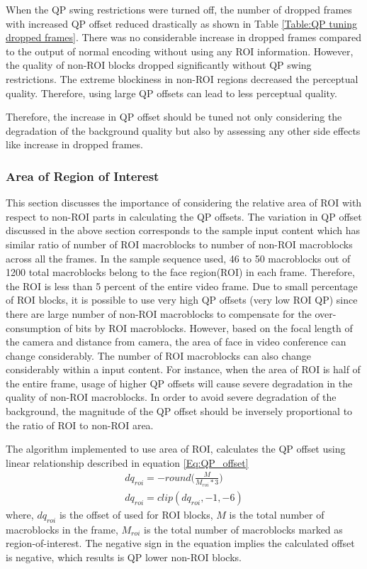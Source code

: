 \documentclass[11pt]{article} %
\begin{document}
When the QP swing restrictions were turned off, the number of dropped frames with increased QP offset reduced drastically as shown in Table \ref{Table:QP tuning dropped frames}. There was no considerable increase in dropped frames compared to the output of normal encoding without using any ROI information. However, the quality of non-ROI blocks dropped significantly without QP swing restrictions. The extreme blockiness in non-ROI regions decreased the perceptual quality. Therefore, using large QP offsets can lead to less perceptual quality. 

Therefore, the increase in QP offset should be tuned not only considering the degradation of the background quality but also by assessing any other side effects like increase in dropped frames.
%
\subsubsection{Area of Region of Interest}
This section discusses the importance of considering the relative area of ROI with respect to non-ROI parts in calculating the QP offsets. The variation in QP offset discussed in the above section corresponds to the sample input content which has similar ratio of number of ROI macroblocks to number of non-ROI macroblocks across all the frames. In the sample sequence used, 46 to 50 macroblocks out of 1200 total macroblocks belong to the face region(ROI) in each frame. Therefore, the ROI is less than 5 percent of the entire video frame. Due to small percentage of ROI blocks, it is possible to use very high QP offsets (very low ROI QP) since there are large number of non-ROI macroblocks to compensate for the over-consumption of bits by ROI macroblocks. However, based on the focal length of the camera and distance from camera, the area of face in video conference can change considerably. The number of ROI macroblocks can also change considerably  within a input content.   For instance, when the area of ROI is half of the entire frame, usage of higher QP offsets will cause severe degradation in the quality of non-ROI macroblocks. In order to avoid severe degradation of the background, the magnitude of the QP offset should be inversely proportional to the ratio of ROI to non-ROI area.

The algorithm implemented to use area of ROI, calculates the QP offset using linear relationship described in equation \ref{Eq:QP_offset}
\begin{equation}
	\label{Eq:QP_offset}
	\begin{aligned}
	dq_{roi} = -round\Big(\frac{M}{M_{roi} * 3}\Big) \\
	dq_{roi} = clip(dq_{roi}, -1 , -6)
	\end{aligned}	
\end{equation}
where, $dq_{roi}$ is the offset of used for ROI blocks, $M$ is the total number of macroblocks in the frame, $M_{roi}$ is the total number of macroblocks marked as region-of-interest. The negative sign in the equation implies the calculated offset is negative, which results is QP lower non-ROI blocks. 
\end{document}
